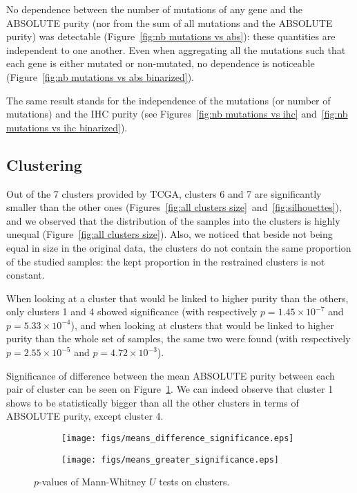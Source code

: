 \documentclass[letterpaper]{article}
\begin{document}
No dependence between the number of mutations of any gene and the ABSOLUTE purity (nor from the sum of all mutations and the ABSOLUTE purity) was detectable
(Figure~\ref{fig:nb mutations vs abs}): these quantities are independent to one another. Even when aggregating all the mutations such that each gene is either
mutated or non-mutated, no dependence is noticeable (Figure~\ref{fig:nb mutations vs abs binarized}).

The same result stands for the independence of the mutations (or number of mutations) and the IHC purity (see Figures~\ref{fig:nb mutations vs ihc}
and~\ref{fig:nb mutations vs ihc binarized}).

\subsection{Clustering}

Out of the 7 clusters provided by TCGA, clusters 6 and 7 are significantly smaller than the other ones (Figures~\ref{fig:all clusters size}~and~\ref{fig:silhouettes}),
and we observed that the distribution of the samples into the clusters is highly unequal (Figure~\ref{fig:all clusters size}). Also, we noticed that beside not being
equal in size in the original data, the clusters do not contain the same proportion of the studied samples: the kept proportion in the restrained clusters is not
constant.

When looking at a cluster that would be linked to higher purity than the others, only clusters 1 and 4 showed significance (with respectively $p = 1.45 \times 10^{-7}$
and $p = 5.33 \times 10^{-4}$), and when looking at clusters that would be linked to higher purity than the whole set of samples, the same two were found
(with respectively $p = 2.55 \times 10^{-5}$ and $p = 4.72 \times 10^{-3}$).

Significance of difference between the mean ABSOLUTE purity between each pair of cluster can be seen on Figure~\ref{fig:Mann Whitney significance}. We can indeed observe that
cluster 1 shows to be statistically bigger than all the other clusters in terms of ABSOLUTE purity, except cluster 4.

\begin{figure}[!h]
\begin{subfigure}{.5\textwidth}
\texttt{[image: figs/means\_difference\_significance.eps]}
\end{subfigure}
\begin{subfigure}{.5\textwidth}
\texttt{[image: figs/means\_greater\_significance.eps]}
\end{subfigure}
\caption{$p$-values of Mann-Whitney $U$ tests on clusters.
\label{fig:Mann Whitney significance}}
\end{figure}
\end{document}
